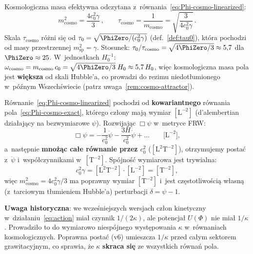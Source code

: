\begin{remark}\label{rem:tau0-cosmo}
Kosmologiczna masa efektywna odczytana
z~r\'ownania~\eqref{eq:Phi-cosmo-linearized}:
\begin{equation}\label{eq:m-cosmo-exact}
  m_{\mathrm{cosmo}}^2 = \frac{4c_0^2\gamma}{3}\,,
  \qquad
  \tau_{\mathrm{cosmo}} = \frac{1}{m_{\mathrm{cosmo}}}
  = \sqrt{\frac{3}{4c_0^2\gamma}}\,.
\end{equation}
Skala $\tau_{\mathrm{cosmo}}$ r\'o\.zni si\k{e}
od $\tau_0 = \sqrt{\PhiZero/(c_0^2\gamma)}$
(def.~\ref{def:tau0}), kt\'ora pochodzi od masy przestrzennej
$m_{\mathrm{sp}}^2 = \gamma$.
Stosunek: $\tau_0/\tau_{\mathrm{cosmo}}
= \sqrt{4\PhiZero/3} \approx 5{,}7$ dla $\PhiZero \approx 25$.
W~jednostkach $H_0^{-1}$:
$\omega_{\mathrm{cosmo}} = m_{\mathrm{cosmo}}\,c_0
= \sqrt{4\PhiZero/3}\;H_0 \approx 5{,}7\,H_0$,
wi\k{e}c kosmologiczna masa pola jest \textbf{wi\k{e}ksza}
od skali Hubble'a, co prowadzi do rezimu niedot\l{}umionego
w~p\'o\'znym Wszech\'swiecie (patrz uwaga~\ref{rem:cosmo-attractor}).
\end{remark}

\begin{remark}\label{rem:dim-mcosmo}
R\'ownanie~\eqref{eq:Phi-cosmo-linearized} pochodzi
od \textbf{kowariantnego} r\'ownania pola~\eqref{eq:Phi-cosmo-exact},
kt\'orego cz\l{}ony maj\k{a} wymiar $[\mathrm{L}^{-2}]$
(d'alembertian dzia\l{}aj\k{a}cy na bezwymiarowe $\psi$).
Rozwijaj\k{a}c $\Box\psi$ w~metryce FRW:
\[
  \Box\psi
  = -\frac{1}{c_0^2}\ddot\psi - \frac{3H}{c_0^2}\dot\psi
  + \ldots
  \qquad\bigl[\mathrm{L}^{-2}\bigr],
\]
a~nast\k{e}pnie \textbf{mno\.z\k{a}c ca\l{}e r\'ownanie przez $c_0^2$}
($[\mathrm{L}^{2}\mathrm{T}^{-2}]$), otrzymujemy posta\'c
z~$\ddot\psi$ i~wsp\'o\l{}czynnikami w~$[\mathrm{T}^{-2}]$.
Sp\'ojno\'s\'c wymiarowa jest trywialna:
\[
  c_0^2\gamma
  = [\mathrm{L}^{2}\mathrm{T}^{-2}] \cdot [\mathrm{L}^{-2}]
  = [\mathrm{T}^{-2}],
\]
wi\k{e}c $m_{\mathrm{cosmo}}^2 = 4c_0^2\gamma/3$
ma poprawny wymiar $[\mathrm{T}^{-2}]$
i~jest cz\k{e}stotliwo\'sci\k{a} w\l{}asn\k{a} (z~tarciowym
t\l{}umieniem Hubble'a) perturbacji $\delta = \psi - 1$.

\textbf{Uwaga historyczna}: we wcze\'sniejszych wersjach
cz\l{}on kinetyczny w~dzia\l{}aniu~\eqref{eq:action}
mia\l{} czynnik $1/(2\kappa)$, ale potencja\l{} $U(\Phi)$
nie mia\l{} $1/\kappa$. Prowadzi\l{}o to do wymiarowo
niespójnego wyst\k{e}powania $\kappa$ w~r\'ownaniach
kosmologicznych. Poprawna postać (v6) umieszcza
$1/\kappa$ przed ca\l{}ym sektorem grawitacyjnym,
co sprawia, \.ze $\kappa$ \textbf{skraca si\k{e}}
ze wszystkich r\'owna\'n pola.
\end{remark}

